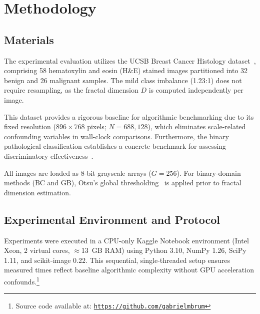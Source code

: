 \section{Methodology}
\label{sec:methodology}

\subsection{Materials}
\label{subsec:materials}

The experimental evaluation utilizes the UCSB Breast Cancer Histology dataset~\cite{Gelasca2008}, comprising 58 hematoxylin and eosin (H\&E) stained images partitioned into 32 benign and 26 malignant samples. The mild class imbalance (1.23:1) does not require resampling, as the fractal dimension $D$ is computed independently per image. 

This dataset provides a rigorous baseline for algorithmic benchmarking due to its fixed resolution ($896 \times 768$ pixels; $N = 688{,}128$), which eliminates scale-related confounding variables in wall-clock comparisons. Furthermore, the binary pathological classification establishes a concrete benchmark for assessing discriminatory effectiveness~\cite{Roberto2021,Borgue2025}. 

All images are loaded as 8-bit grayscale arrays ($G = 256$). For binary-domain methods (BC and GB), Otsu's global thresholding~\cite{Otsu1979} is applied prior to fractal dimension estimation.

\subsection{Experimental Environment and Protocol}
\label{subsec:environment}

Experiments were executed in a CPU-only Kaggle Notebook environment (Intel Xeon, 2 virtual cores, $\approx$13~GB RAM) using Python 3.10, NumPy 1.26, SciPy 1.11, and scikit-image 0.22. This sequential, single-threaded setup ensures measured times reflect baseline algorithmic complexity without GPU acceleration confounds.\footnote{Source code available at: \href{https://github.com/gabrielmbrum}{\texttt{https://github.com/gabrielmbrum}}}

